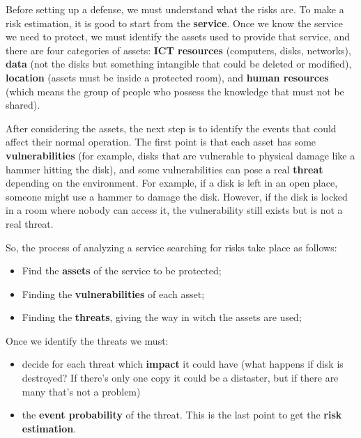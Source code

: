 Before setting up a defense, we must understand what the risks are. To make a risk estimation, it is good to start from the \textbf{service}. Once we know the service we need to protect, we must identify the assets used to provide that service, and there are four categories of assets: \textbf{ICT resources} (computers, disks, networks), \textbf{data} (not the disks but something intangible that could be deleted or modified), \textbf{location} (assets must be inside a protected room), and \textbf{human resources} (which means the group of people who possess the knowledge that must not be shared).

After considering the assets, the next step is to identify the events that could affect their normal operation. The first point is that each asset has some \textbf{vulnerabilities} (for example, disks that are vulnerable to physical damage like a hammer hitting the disk), and some vulnerabilities can pose a real \textbf{threat} depending on the environment. For example, if a disk is left in an open place, someone might use a hammer to damage the disk. However, if the disk is locked in a room where nobody can access it, the vulnerability still exists but is not a real threat.

\vspace{5mm}
So, the process of analyzing a service searching for risks take place as follows:
\begin{itemize}[]
  \item Find the \textbf{assets} of the service to be protected;
  \item Finding the \textbf{vulnerabilities} of each asset;
  \item Finding the \textbf{threats}, giving the way in witch the assets are used;
\end{itemize}

\vspace{5mm}
Once we identify the threats we must:
\begin{itemize}
  \item decide for each threat which \textbf{impact} it could have (what happens if disk is destroyed? If there's only one copy it could be a distaster, but if there are many that's not a problem)
  \item the \textbf{event probability} of the threat. This is the last point to get the \textbf{risk estimation}.
\end{itemize}

 {}
  


